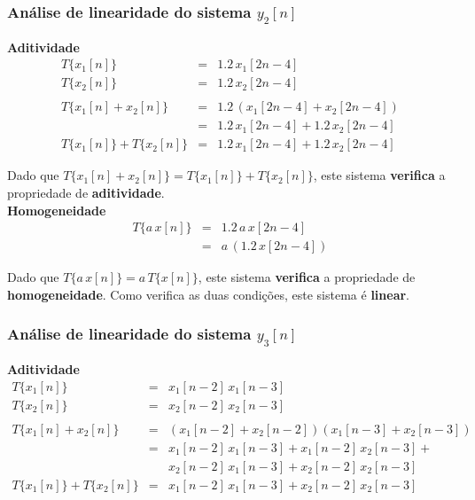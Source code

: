 \documentclass[a4paper]{article}
\begin{document}
\subsubsection{Análise de linearidade do sistema $y_{2}[n]$}
\noindent \textbf{Aditividade}
\begin{eqnarray}
	T\{x_{1}[n]\}					& = & 1.2 \, x_{1}[2n - 4] \\
	T\{x_{2}[n]\}					& = & 1.2 \, x_{2}[2n - 4] \\
	\nonumber \\
	T\{x_{1}[n] + x_{2}[n]\}		& = & 1.2 \, (x_{1}[2n - 4] + x_{2}[2n - 4]) \\
									& = & 1.2 \, x_{1}[2n - 4] + 1.2 \, x_{2}[2n - 4] \\
	T\{x_{1}[n]\} + T\{x_{2}[n]\}	& = & 1.2 \, x_{1}[2n - 4] + 1.2 \, x_{2}[2n - 4]
\end{eqnarray}

\noindent Dado que $T\{x_{1}[n] + x_{2}[n]\} = T\{x_{1}[n]\} + T\{x_{2}[n]\}$, este sistema \textbf{verifica} a propriedade de \textbf{aditividade}. \\

\noindent \textbf{Homogeneidade}
\begin{eqnarray}
	T\{a \, x[n]\}					& = & 1.2 \, a \, x[2n - 4] \\
									& = & a \, (1.2 \, x[2n - 4])
\end{eqnarray}

\noindent Dado que $T\{a \, x[n]\} = a \, T\{x[n]\}$, este sistema \textbf{verifica} a propriedade de \textbf{homogeneidade}. Como verifica as duas condições, este sistema é \textbf{linear}.

\subsubsection{Análise de linearidade do sistema $y_{3}[n]$}
\noindent \textbf{Aditividade}
\begin{eqnarray}
	T\{x_{1}[n]\}					& = & x_{1}[n - 2] \, x_{1}[n - 3] \\
	T\{x_{2}[n]\}					& = & x_{2}[n - 2] \, x_{2}[n - 3] \\
	\nonumber \\
	T\{x_{1}[n] + x_{2}[n]\}		& = & (x_{1}[n - 2] + x_{2}[n - 2]) (x_{1}[n - 3] + x_{2}[n - 3]) \\
									& = & x_{1}[n - 2] \, x_{1}[n - 3] + x_{1}[n - 2] \, x_{2}[n - 3] + \nonumber \\ && x_{2}[n - 2] \, x_{1}[n - 3] + x_{2}[n - 2] \, x_{2}[n - 3] \\
	T\{x_{1}[n]\} + T\{x_{2}[n]\}	& = & x_{1}[n - 2] \, x_{1}[n - 3] + x_{2}[n - 2] \, x_{2}[n - 3]
\end{eqnarray}
\end{document}
